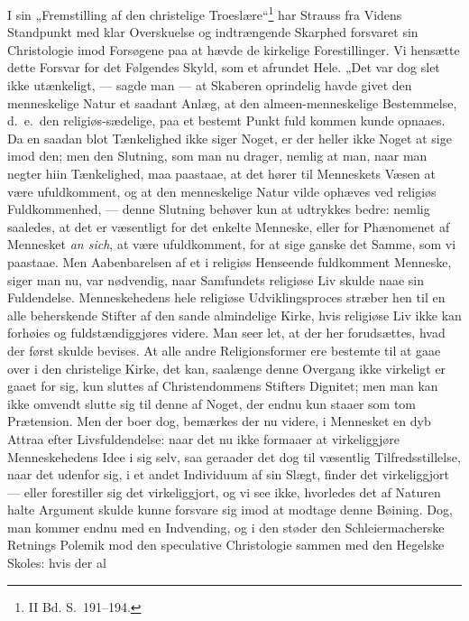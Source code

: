 \documentclass[12pt]{book}
\begin{document}
I sin „Fremstilling af den christelige Troeslære“\footnote{II Bd.
S.\ 191--194.} har Strauss fra Videns Standpunkt med klar
Overskuelse og indtrængende Skarphed forsvaret sin Christologie imod
Forsøgene paa at hævde de kirkelige Forestillinger. Vi hensætte
dette Forsvar for det Følgendes Skyld, som et afrundet Hele. „Det
var dog slet ikke utænkeligt, --- sagde man --- at Skaberen
oprindelig havde givet den menneskelige Natur et saadant Anlæg, at
den almeen-menneskelige Bestemmelse, d.\ e.\ den religiøs-sædelige,
paa et bestemt Punkt fuld\-
kommen kunde opnaaes. Da en saadan blot Tænkelighed ikke siger
Noget, er der heller ikke Noget at sige imod den; men den Slutning,
som man nu drager, nemlig at man, naar man negter hiin Tænkelighed,
maa paastaae, at det hører til Menneskets Væsen at være
ufuldkomment, og at den menneskelige Natur vilde ophæves ved
religiøs Fuldkommenhed, --- denne Slutning behøver kun at udtrykkes
bedre: nemlig saaledes, at det er væsentligt for det enkelte
Menneske, eller for Phænomenet af Mennesket \textit{an sich}, at
være ufuldkomment, for at sige ganske det Samme, som vi paastaae.
Men Aabenbarelsen af et i religiøs Henseende fuldkomment Menneske,
siger man nu, var nødvendig, naar Samfundets religiøse Liv skulde
naae sin Fuldendelse. Menneskehedens hele religiøse Udviklingsproces
stræber hen til en alle beherskende Stifter af den sande almindelige
Kirke, hvis religiøse Liv ikke kan forhøies og fuldstændiggjøres
videre. Man seer let, at der her forudsættes, hvad der først skulde
bevises. At alle andre Religionsformer ere bestemte til at gaae over
i den christelige Kirke, det kan, saalænge denne Overgang ikke
virkeligt er gaaet for sig, kun sluttes af Christendommens Stifters
Dignitet; men man kan ikke omvendt slutte sig til denne af Noget,
der endnu kun staaer som tom Prætension. Men der boer dog, bemærkes
der nu videre, i Mennesket en dyb Attraa efter Livsfuldendelse: naar
det nu ikke formaaer at virkeliggjøre Menneskehedens Idee i sig
selv, saa geraader det dog til væsentlig Tilfredsstillelse, naar det
udenfor sig, i et andet Individuum af sin Slægt, finder det
virkeliggjort --- eller forestiller sig det virkeliggjort, og vi see
ikke, hvorledes det af Naturen halte Argument skulde kunne forsvare
sig imod at modtage denne Bøining. Dog, man kommer endnu med en
Indvending, og i den støder den Schleiermacherske Retnings Polemik
mod den speculative Christologie sammen med den Hegelske Skoles:
hvis der al\-
\end{document}
